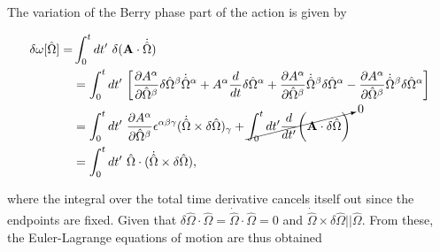 The variation of the Berry phase part of the action is given by 

\begin{equation}
    \begin{split}
        \delta\omega[\hat{\Omega}] =& \int_0^t dt' \textnormal{ } \delta({\bf A} \cdot \dot{\hat{\Omega}}) \\
        &= \int_{0}^{t} dt' \textnormal{ } \bigg[\frac{\partial A^\alpha}{\partial \hat{\Omega}^\beta} \delta\hat{\Omega}^\beta \dot{\hat{\Omega}}^\alpha + A^\alpha \frac{d}{dt} \delta \hat{\Omega}^\alpha + \frac{\partial A^\alpha}{\partial \hat{\Omega}^\beta} \dot{\hat{\Omega}}^\beta \delta \hat{\Omega}^\alpha - \frac{\partial A^{\alpha}}{\partial \hat{\Omega}^\beta} \dot{\hat{\Omega}}^\beta \delta \hat{\Omega}^\alpha\bigg] \\
        &= \int_{0}^{t} dt' \textnormal{ } \frac{\partial A^{\alpha}}{\partial \hat{\Omega}^\beta} \epsilon^{\alpha \beta \gamma} (\dot{\hat{\Omega}} \times \delta \hat{\Omega})_{\gamma} + \cancelto{0}{\int_{0}^{t} dt' \frac{d}{dt'} \bigg({\bf A} \cdot \delta\hat{\Omega}\bigg)} \\
        &= \int_{0}^{t} dt' \textnormal{ } {\hat{\Omega}} \cdot (\dot{\hat{\Omega}} \times \delta \hat{\Omega}),
        \label{Berry_phase_semiclassical_variation}
    \end{split}
\end{equation}

where the integral over the total time derivative cancels itself out since the endpoints are fixed. Given that $\delta{\hat{\Omega}} \cdot \hat{\Omega} = \dot{\hat{\Omega}} \cdot \hat{\Omega} = 0$ and $\dot{\hat{\Omega}} \times \delta \hat{\Omega} || \hat{\Omega}$. From these, the Euler-Lagrange equations of motion are thus obtained 


